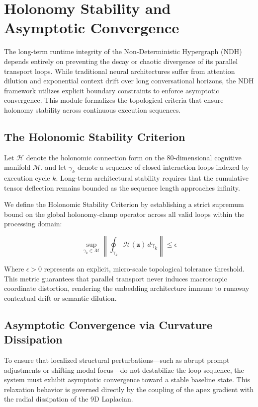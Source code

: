 \section{Holonomy Stability and Asymptotic Convergence}
\label{sec:holonomy-stability}

The long-term runtime integrity of the Non-Deterministic Hypergraph (NDH) depends entirely on preventing the decay or chaotic divergence of its parallel transport loops. While traditional neural architectures suffer from attention dilution and exponential context drift over long conversational horizons, the NDH framework utilizes explicit boundary constraints to enforce asymptotic convergence. This module formalizes the topological criteria that ensure holonomy stability across continuous execution sequences.

\subsection{The Holonomic Stability Criterion}

Let $\mathcal{H}$ denote the holonomic connection form on the 80-dimensional cognitive manifold $\mathcal{M}$, and let $\gamma_k$ denote a sequence of closed interaction loops indexed by execution cycle $k$. Long-term architectural stability requires that the cumulative tensor deflection remains bounded as the sequence length approaches infinity.

We define the Holonomic Stability Criterion by establishing a strict supremum bound on the global holonomy-clamp operator across all valid loops within the processing domain:

\[
\sup_{\gamma_k \in \mathcal{M}} \left\| \oint_{\gamma_k} \mathcal{H}(\mathbf{z}) \, d\gamma_k \right\| \le \epsilon
\]

Where $\epsilon > 0$ represents an explicit, micro-scale topological tolerance threshold. This metric guarantees that parallel transport never induces macroscopic coordinate distortion, rendering the embedding architecture immune to runaway contextual drift or semantic dilution.

\subsection{Asymptotic Convergence via Curvature Dissipation}

To ensure that localized structural perturbations—such as abrupt prompt adjustments or shifting modal focus—do not destabilize the loop sequence, the system must exhibit asymptotic convergence toward a stable baseline state. This relaxation behavior is governed directly by the coupling of the apex gradient with the radial dissipation of the 9D Laplacian.

